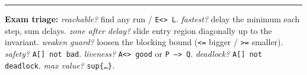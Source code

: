 \vspace{4pt}
\hrule
\vspace{2pt}
{\footnotesize\textbf{Exam triage:} \emph{reachable?} find any run / \texttt{E<> L}. \emph{fastest?} delay the minimum each step, sum delays. \emph{zone after delay?} slide entry region diagonally up to the invariant. \emph{weaken guard?} loosen the blocking bound (\texttt{<=} bigger / \texttt{>=} smaller). \emph{safety?} \texttt{A[] not bad}. \emph{liveness?} \texttt{A<> good} or \texttt{P --> Q}. \emph{deadlock?} \texttt{A[] not deadlock}. \emph{max value?} \texttt{sup\{\dots\}}.}
